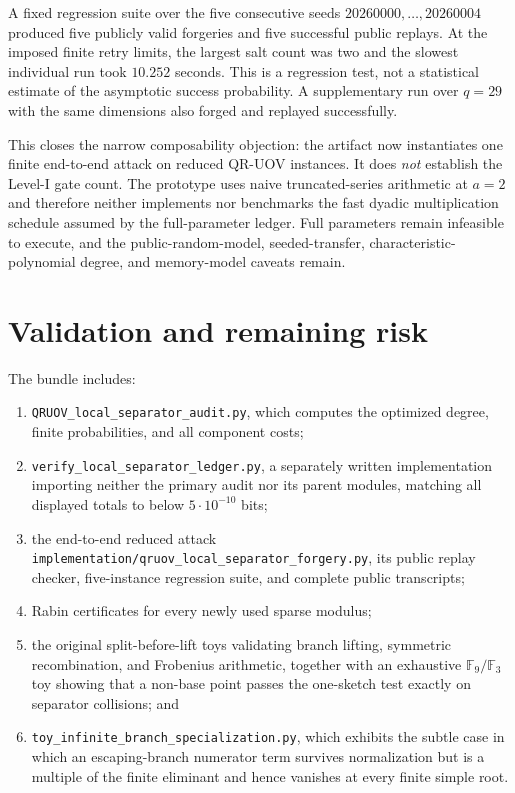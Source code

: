 \documentclass[11pt,a4paper]{article}
\theoremstyle{definition}
\theoremstyle{remark}
\newcommand{\F}{\mathbb F}
\begin{document}
A fixed regression suite over the five consecutive seeds $20260000,\ldots,20260004$ produced five publicly valid forgeries and five successful public replays.  At the imposed finite retry limits, the largest salt count was two and the slowest individual run took $10.252$ seconds.  This is a regression test, not a statistical estimate of the asymptotic success probability.  A supplementary run over $q=29$ with the same dimensions also forged and replayed successfully.

This closes the narrow composability objection: the artifact now instantiates one finite end-to-end attack on reduced QR-UOV instances.  It does \emph{not} establish the Level-I gate count.  The prototype uses naive truncated-series arithmetic at $a=2$ and therefore neither implements nor benchmarks the fast dyadic multiplication schedule assumed by the full-parameter ledger.  Full parameters remain infeasible to execute, and the public-random-model, seeded-transfer, characteristic-polynomial degree, and memory-model caveats remain.

\section{Validation and remaining risk}

The bundle includes:
\begin{enumerate}
\item \texttt{QRUOV\_local\_separator\_audit.py}, which computes the optimized degree, finite probabilities, and all component costs;
\item \texttt{verify\_local\_separator\_ledger.py}, a separately written implementation importing neither the primary audit nor its parent modules, matching all displayed totals to below $5\cdot10^{-10}$ bits;
\item the end-to-end reduced attack \texttt{implementation/qruov\_local\_separator\_forgery.py}, its public replay checker, five-instance regression suite, and complete public transcripts;
\item Rabin certificates for every newly used sparse modulus;
\item the original split-before-lift toys validating branch lifting, symmetric recombination, and Frobenius arithmetic, together with an exhaustive $\F_9/\F_3$ toy showing that a non-base point passes the one-sketch test exactly on separator collisions; and
\item \texttt{toy\_infinite\_branch\_specialization.py}, which exhibits the subtle case in which an escaping-branch numerator term survives normalization but is a multiple of the finite eliminant and hence vanishes at every finite simple root.
\end{enumerate}
\end{document}
